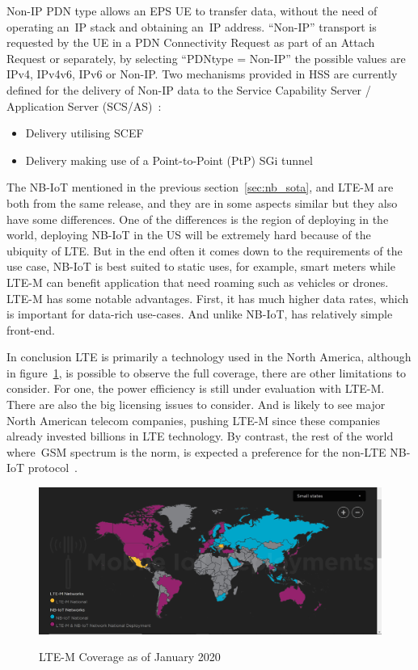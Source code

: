 Non-IP PDN type allows an EPS UE to transfer data,  without the need of  operating an~\gls{IP} stack and obtaining an~\gls{IP} address. “Non-IP” transport is requested by the UE in a PDN Connectivity Request as part of an Attach Request or separately, by selecting “PDNtype = Non-IP” the possible values are IPv4, IPv4v6, IPv6 or Non-IP. Two mechanisms provided in HSS are currently defined for
the delivery of Non-IP data to the Service Capability Server / Application Server (SCS/AS)~\cite{LTE-M}:
\begin{itemize}
	\item Delivery utilising SCEF
	\item Delivery making use of  a Point-to-Point (PtP) SGi tunnel

\end{itemize} 

The NB-IoT mentioned in the previous section~\ref{sec:nb_sota}, and LTE-M are both from the same release, and they are in some aspects similar but they also have some differences. One of the differences is the region of deploying in the world, deploying NB-IoT in the US will be extremely hard because of the ubiquity of LTE. 
But in the end often it comes down to the requirements of the use case, NB-IoT is best suited to static uses,  for example,  smart meters while LTE-M can benefit application that need  roaming  such as vehicles or drones. LTE-M has some notable advantages. First, it has much higher data rates, which is important for data-rich use-cases. And unlike NB-IoT, has relatively simple front-end.

In conclusion LTE is primarily a technology used in the North America, although in figure~\ref{fig:LTE-M}, is possible to observe the full coverage, there are other limitations to consider. For one, the power efficiency is still under evaluation with LTE-M. There are also the big licensing issues to consider.
And is likely to see major North American telecom companies, pushing LTE-M since these companies already invested billions in LTE technology. By contrast,  the rest of the world where~\gls{GSM} spectrum is the norm, is expected  a preference for the non-LTE NB-IoT protocol~\cite{Hwang2018}.

\begin{figure}[htbp]

  \centering
  
    {\includegraphics[height=2 in,width=0.75\linewidth]{Chapters/Figures/LTE-coverage.JPG}}%
 
  \caption{LTE-M Coverage as of January 2020~\cite{IoTCoverage}}
  \label{fig:LTE-M}
  
\end{figure}


